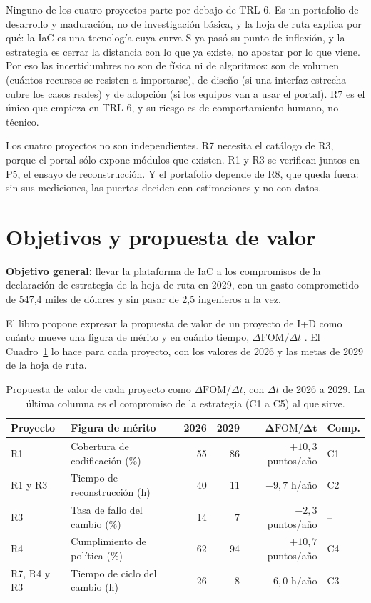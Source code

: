 \documentclass[11pt,letterpaper]{article}
\begin{document}
Ninguno de los cuatro proyectos parte por debajo de TRL 6. Es un portafolio de
desarrollo y maduración, no de investigación básica, y la hoja de ruta explica
por qué: la IaC es una tecnología cuya curva S ya pasó su punto de inflexión, y
la estrategia es cerrar la distancia con lo que ya existe, no apostar por lo que
viene. Por eso las incertidumbres no son de física ni de algoritmos: son de
volumen (cuántos recursos se resisten a importarse), de diseño (si una interfaz
estrecha cubre los casos reales) y de adopción (si los equipos van a usar el
portal). R7 es el único que empieza en TRL 6, y su riesgo es de comportamiento
humano, no técnico.

Los cuatro proyectos no son independientes. R7 necesita el catálogo de R3,
porque el portal sólo expone módulos que existen. R1 y R3 se verifican juntos en
P5, el ensayo de reconstrucción. Y el portafolio depende de R8, que queda
fuera: sin sus mediciones, las puertas deciden con estimaciones y no con datos.

\section{Objetivos y propuesta de valor}
\label{sec:objetivos}

\textbf{Objetivo general:} llevar la plataforma de IaC a los compromisos de la
declaración de estrategia de la hoja de ruta en 2029, con un gasto
comprometido de 547,4 miles de dólares y sin pasar de 2,5 ingenieros a la vez.

El libro propone expresar la propuesta de valor de un proyecto de I+D como
cuánto mueve una figura de mérito y en cuánto tiempo, $\Delta\mathrm{FOM}/\Delta t$
\autocite[ec.~16.1]{deweck2022}. El Cuadro~\ref{tab:fom} lo hace para cada
proyecto, con los valores de 2026 y las metas de 2029 de la hoja de ruta.

\begin{table}[H]
\centering
\footnotesize
\setlength{\tabcolsep}{4pt}
\caption{Propuesta de valor de cada proyecto como $\Delta\mathrm{FOM}/\Delta t$,
con $\Delta t$ de 2026 a 2029. La última columna es el compromiso de la
estrategia (C1 a C5) al que sirve.}
\label{tab:fom}
\begin{tabular}{@{}llrrrl@{}}
\toprule
\textbf{Proyecto} & \textbf{Figura de mérito} & \textbf{2026} &
  \textbf{2029} & $\boldsymbol{\Delta\mathrm{FOM}/\Delta t}$ & \textbf{Comp.} \\
\midrule
R1      & Cobertura de codificación (\%) & 55 & 86 & $+10{,}3$ puntos/año & C1 \\
R1 y R3 & Tiempo de reconstrucción (h)    & 40 & 11 & $-9{,}7$ h/año & C2 \\
R3      & Tasa de fallo del cambio (\%)   & 14 &  7 & $-2{,}3$ puntos/año & -- \\
R4      & Cumplimiento de política (\%)   & 62 & 94 & $+10{,}7$ puntos/año & C4 \\
R7, R4 y R3 & Tiempo de ciclo del cambio (h) & 26 &  8 & $-6{,}0$ h/año & C3 \\
\bottomrule
\end{tabular}
\end{table}
\end{document}
